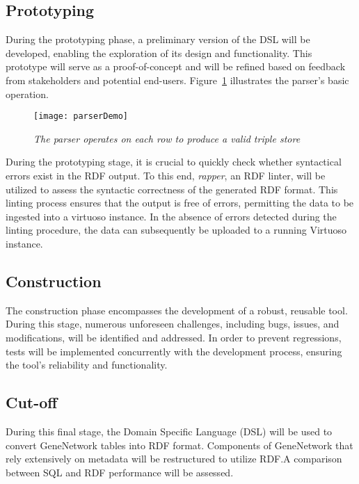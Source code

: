 \subsection{Prototyping}

During the prototyping phase, a preliminary version of the DSL will be developed, enabling the exploration of its design and functionality.  This prototype will serve as a proof-of-concept and will be refined based on feedback from stakeholders and potential end-users.  Figure~\ref{fig:parser-demo} illustrates the parser's basic operation.

\begin{figure}[H]
\centering
\texttt{[image: parserDemo]}
\caption{\textit{The parser operates on each row to produce a valid triple store}}\label{fig:parser-demo}
\centering
\end{figure}

During the prototyping stage, it is crucial to quickly check whether syntactical errors exist in the RDF output.  To this end, \textit{rapper}, an RDF linter, will be utilized to assess the syntactic correctness of the generated RDF format.  This linting process ensures that the output is free of errors, permitting the data to be ingested into a virtuoso instance.  In the absence of errors detected during the linting procedure, the data can subsequently be uploaded to a running Virtuoso instance.

\subsection{Construction}

The construction phase encompasses the development of a robust, reusable tool.  During this stage, numerous unforeseen challenges, including bugs, issues, and modifications, will be identified and addressed.  In order to prevent regressions, tests will be implemented concurrently with the development process, ensuring the tool's reliability and functionality.

\subsection{Cut-off}

During this final stage, the Domain Specific Language (DSL) will be used to convert GeneNetwork tables into RDF format.  Components of GeneNetwork that rely extensively on metadata will be restructured to utilize RDF.\@  A comparison between SQL and RDF performance will be assessed.

